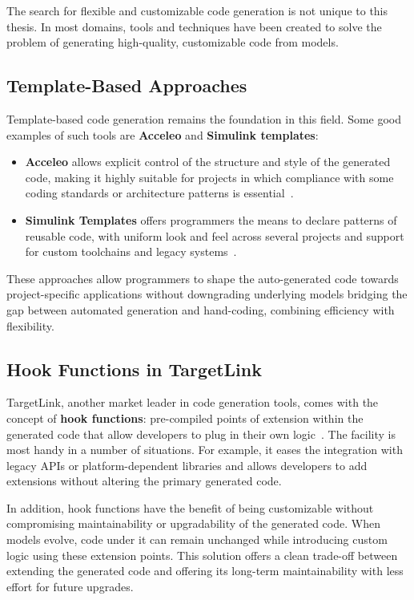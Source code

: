 The search for flexible and customizable code generation is not unique to this thesis. In most domains, tools and techniques have been created to solve the problem of generating high-quality, customizable code from models.

\subsection{Template-Based Approaches}
\label{sec:template}

Template-based code generation remains the foundation in this field. Some good examples of such tools are \textbf{Acceleo} and \textbf{Simulink templates}: 

\begin{itemize} 
	\item \textbf{Acceleo} allows explicit control of the structure and style of the generated code, making it highly suitable for projects in which compliance with some coding standards or architecture patterns is essential~\cite{AcceleoUserGuide}. 
	\item \textbf{Simulink Templates} offers programmers the means to declare patterns of reusable code, with uniform look and feel across several projects and support for custom toolchains and legacy systems~\cite{simulink_templates}.
\end{itemize}

These approaches allow programmers to shape the auto-generated code towards project-specific applications without downgrading underlying models bridging the gap between automated generation and hand-coding, combining efficiency with flexibility.

\subsection{Hook Functions in TargetLink}
\label{sec:hook:functions}

TargetLink, another market leader in code generation tools, comes with the concept of \textbf{hook functions}: pre-compiled points of extension within the generated code that allow developers to plug in their own logic~\cite{target_link_features}. The facility is most handy in a number of situations. For example, it eases the integration with legacy APIs or platform-dependent libraries and allows developers to add extensions without altering the primary generated code.

In addition, hook functions have the benefit of being customizable without compromising maintainability or upgradability of the generated code. When models evolve, code under it can remain unchanged while introducing custom logic using these extension points. This solution offers a clean trade-off between extending the generated code and offering its long-term maintainability with less effort for future upgrades.

